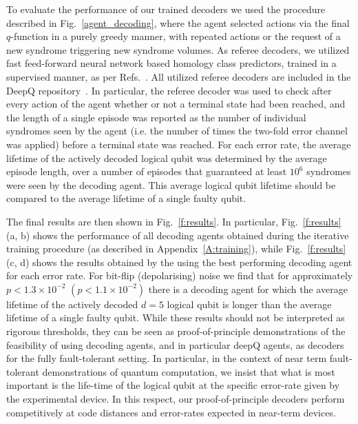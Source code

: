 \documentclass[twocolumn,preprintnumbers,amsmath,amssymb,notitlepage,nofootinbib,longbibliography,superscriptaddress,aps,pra,10pt]{revtex4-1}
\begin{document}
	To evaluate the performance of our trained decoders we used the procedure described in Fig.~\ref{agent_decoding}, where the agent selected actions via the final $q$-function in a purely greedy manner, with repeated actions or the request of a new syndrome triggering new syndrome volumes.
	As referee decoders, we utilized fast feed-forward neural network based homology class predictors, trained in a supervised manner, as per Refs.~\cite{Torlai10, Varsamopoulos17}.
	All utilized referee decoders are included in the DeepQ repository~\cite{DeepQDecoding}.
	In particular, the referee decoder was used to check after every action of the agent whether or not a terminal state had been reached, and the length of a single episode was reported as the number of individual syndromes seen by the agent (i.e. the number of times the two-fold error channel was applied) before a terminal state was reached.
	For each error rate, the average lifetime of the actively decoded logical qubit was determined by the average episode length, over a number of episodes that guaranteed at least $10^6$ syndromes were seen by the decoding agent.
	This average logical qubit lifetime should be compared to the average lifetime of a single faulty qubit.

	The final results are then shown in Fig.~\ref{f:results}.
	In particular, Fig.~\ref{f:results} (a, b) shows the performance of all decoding agents obtained during the iterative training procedure (as described in Appendix~\ref{A:training}), while Fig.~\ref{f:results} (c, d) shows the results obtained by the using the best performing decoding agent for each error rate.
	For bit-flip (depolarising) noise we find that for approximately $p < 1.3\times 10^{-2}$ $(p < 1.1\times 10^{-2})$ there is a decoding agent for which the average lifetime of the actively decoded $d=5$ logical qubit is longer than the average lifetime of a single faulty qubit.
	While these results should not be interpreted as rigorous thresholds, they can be seen as proof-of-principle demonstrations of the feasibility of using decoding agents, and in particular deepQ agents, as decoders for the fully fault-tolerant setting.
	In particular, in the context of near term fault-tolerant demonstrations of quantum computation, we insist that 
	what is most important is the life-time of the logical qubit at the specific error-rate given by the experimental device.
	In this respect, our proof-of-principle decoders perform competitively at code distances and error-rates expected in near-term devices.
\end{document}
